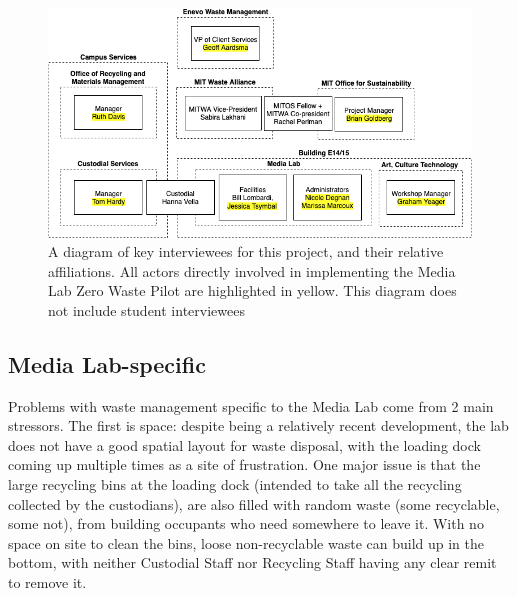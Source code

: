 \documentclass[nofonts,nols,justified,nobib]{tufte-book}
\begin{document}
\begin{figure}
  \caption{A diagram of key interviewees for this project, and their relative affiliations. All actors directly involved in implementing the Media Lab Zero Waste Pilot are highlighted in yellow. This diagram does not include student interviewees}
  \includegraphics[width=1\linewidth]{img/2/interviewees.png}
\end{figure}

\subsection*{Media Lab-specific}

Problems with waste management specific to the Media Lab come from 2 main stressors. The first is space: despite being a relatively recent development, the lab does not have a good spatial layout for waste disposal, with the loading dock coming up multiple times as a site of frustration. One major issue is that the large recycling bins at the loading dock (intended to take all the recycling collected by the custodians), are also filled with random waste (some recyclable, some not), from building occupants who need somewhere to leave it. With no space on site to clean the bins, loose non-recyclable waste can build up in the bottom, with neither Custodial Staff nor Recycling Staff having any clear remit to remove it.
\end{document}
